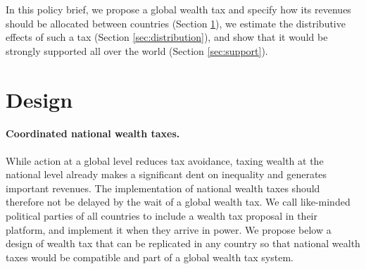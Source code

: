 \documentclass[12pt,english]{article}
\begin{document}
In this policy brief, we propose a global wealth tax and specify how its revenues should be allocated between countries (Section \ref{sec:design}), we estimate the distributive effects of such a tax (Section \ref{sec:distribution}), and show that it would be strongly supported all over the world (Section \ref{sec:support}).

\section{Design}\label{sec:design}

\paragraph{Coordinated national wealth taxes.} While action at a global level reduces tax avoidance, taxing wealth at the national level already makes a significant dent on inequality and generates important revenues. 
The implementation of national wealth taxes should therefore not be delayed by the wait of a global wealth tax. 
We call like-minded political parties of all countries to include a wealth tax proposal in their platform, and implement it when they arrive in power. We propose below a design of wealth tax that can be replicated in any country so that national wealth taxes would be compatible and part of a global wealth tax system. 
\end{document}
